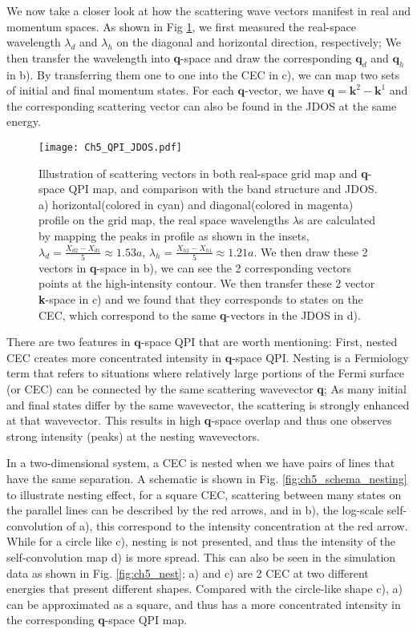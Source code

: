We now take a closer look at how the scattering wave vectors manifest in real and momentum spaces. As shown in Fig \ref{fig:ch5_compare}, we first measured the real-space wavelength $\lambda_d$ and $\lambda_h$ on the diagonal and horizontal direction, respectively; We then transfer the wavelength into \textbf{q}-space and draw the corresponding $\textbf{q}_d$ and $\textbf{q}_h$ in b). By transferring them one to one into the \ac{CEC} in c), we can map two sets of initial and final momentum states. For each $\textbf{q}$-vector, we have $\textbf{q} = \textbf{k}^2 - \textbf{k}^1$ and the corresponding scattering vector can also be found in the \ac{JDOS} at the same energy. 
\begin{figure}
	\texttt{[image: Ch5\_QPI\_JDOS.pdf]} 
	\centering
	\caption{Illustration of scattering vectors in both real-space grid map and \textbf{q}-space QPI map, and comparison with the band structure and JDOS. a) horizontal(colored in cyan) and diagonal(colored in magenta) profile on the grid map, the real space wavelengths $\lambda$s are calculated by mapping the peaks in profile as shown in the insets, $\lambda_d = \frac{X_{d2}-X_{d1}}{5} \approx 1.53 a$, $\lambda_h = \frac{X_{h2}-X_{h1}}{5} \approx 1.21 a$. We then draw these 2 vectors in \textbf{q}-space in b), we can see the 2 corresponding vectors points at the high-intensity contour. We then transfer these 2 vector \textbf{k}-space in c) and we found that they corresponds to states on the \ac{CEC}, which correspond to the same \textbf{q}-vectors in the \ac{JDOS} in d).}
	\label{fig:ch5_compare}
\end{figure}

There are two features in $\textbf{q}$-space \ac{QPI} that are worth mentioning: First, nested \ac{CEC} creates more concentrated intensity in $\textbf{q}$-space \ac{QPI}. Nesting is a Fermiology term that refers to situations where relatively large portions of the Fermi surface (or \ac{CEC}) can be connected by the same scattering wavevector \textbf{q}; As many initial and final states differ by the same wavevector, the scattering is strongly enhanced at that wavevector. This results in high \textbf{q}‐space overlap and thus one observes strong intensity (peaks) at the nesting wavevectors. 

In a two-dimensional system, a \ac{CEC} is nested when we have pairs of lines that have the same separation. A schematic is shown in Fig. \ref{fig:ch5_schema_nesting} to illustrate nesting effect, for a square \ac{CEC}, scattering between many states on the parallel lines can be described by the red arrows, and in b), the log-scale self-convolution of a), this correspond to the intensity concentration at the red arrow. While for a circle like c), nesting is not presented, and thus the intensity of the self-convolution map d) is more spread. This can also be seen in the simulation data as shown in Fig. \ref{fig:ch5_nest}; a) and c) are 2 \ac{CEC} at two different energies that present different shapes. Compared with the circle-like shape c), a) can be approximated as a square, and thus has a more concentrated intensity in the corresponding \textbf{q}-space QPI map.

